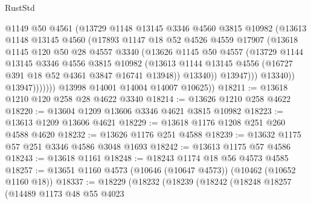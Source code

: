 \begin{lexlean}{RustStd}
\begin{coremodule}
                        @1149
                        @50
                        @4561
                        (@13729
                          @1148
                          @13145
                          @3346
                          @4560
                          @3815
                          @10982
                          (@13613
                            @1148
                            @13145
                            @4560
                            (@17893
                              @1147
                              @18
                              @52
                              @4526
                              @4559
                              @17907
                              (@13618
                                @1145
                                @120
                                @50
                                @28
                                @4557
                                @3340
                                (@13626
                                  @1145
                                  @50
                                  @4557
                                  (@13729
                                    @1144
                                    @13145
                                    @3346
                                    @4556
                                    @3815
                                    @10982
                                    (@13613
                                      @1144
                                      @13145
                                      @4556
                                      (@16727 @391 @18 @52 @4361 @3847 @16741 @13948))
                                    @13340))
                                @13947)))
                          @13340))
                      @13947)))))))
        @13998
        @14001
        @14004
        @14007
        @10625))
@18211 := @13618 @1210 @120 @258 @28 @4622 @3340
@18214 := @13626 @1210 @258 @4622
@18220 := @13604 @1209 @13606 @3346 @4621 @3815 @10982
@18223 := @13613 @1209 @13606 @4621
@18229 := @13618 @1176 @1208 @251 @260 @4588 @4620
@18232 := @13626 @1176 @251 @4588
@18239 := @13632 @1175 @57 @251 @3346 @4586 @3048 @1693
@18242 := @13613 @1175 @57 @4586
@18243 := @13618 @1161
@18248 := @18243 @1174 @18 @56 @4573 @4585
@18257 := @13651 @1160 @4573 (@10646 (@10647 @4573)) (@10462 (@10652 @1160 @18))
@18337 := @18229
    (@18232
      (@18239
        (@18242
          (@18248
            @18257
            (@14489
              @1173
              @48
              @55
              @4023

\end{coremodule}
\end{lexlean}
